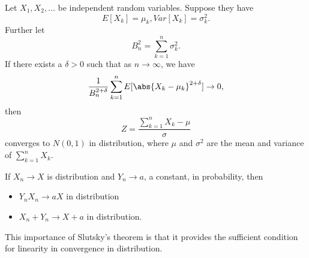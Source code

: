 \begin{refsection}
\begin{theorem}
Let $X_1,X_2,...$ be independent random variables. Suppose they have $$E[X_k] = \mu_k, Var[X_k] = \sigma_k^2.$$
Further let 
$$B_n^2  = \sum_{k=1}^n \sigma_k^2.$$
If there exists a $\delta >0$ such that as $n\to \infty$, we have
$$\frac{1}{B_n^{2+\delta}} \sum_{k=1}^n E[\abs{X_k-\mu_k}^{2+\delta}] \to 0,$$
then
$$Z = \frac{\sum_{k=1}^n X_k - \mu}{\sigma}$$
converges to $N(0,1)$ in distribution, where $\mu$ and $\sigma^2$ are the mean and variance of $\sum_{k=1}^n X_k$.
	
\end{theorem}

\begin{lemma}\cite[239]{casella2002statistical}
If $X_n\to X$ is distribution and $Y_n \to a$, a constant, in probability, then
\begin{itemize}
	\item $Y_nX_n \to aX$ in distribution\\
	\item $X_n + Y_n \to X + a$ in distribution.
\end{itemize} 
\end{lemma}

\begin{remark}
This importance of Slutsky's theorem is that it provides the sufficient condition for linearity in convergence in distribution.
\end{remark}



\end{refsection}
